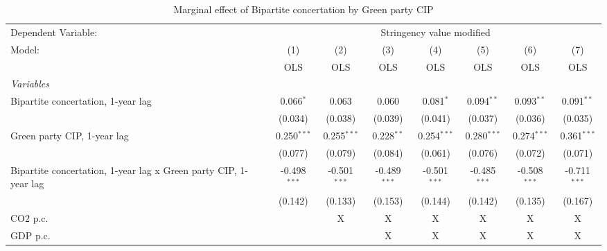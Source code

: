 
\begin{table}[htbp]
   \caption{Marginal effect of Bipartite concertation by Green party CIP}
   \centering
   \begin{tabular}{lccccccc}
      \toprule
      Dependent Variable: & \multicolumn{7}{c}{Stringency value modified}\\
      Model:                                                           & (1)            & (2)            & (3)            & (4)            & (5)            & (6)            & (7)\\  
                                                                       &  OLS           & OLS            & OLS            & OLS            & OLS            & OLS            & OLS\\  
      \midrule
      \emph{Variables}\\
      Bipartite concertation, 1-year lag                               & 0.066$^{*}$    & 0.063          & 0.060          & 0.081$^{*}$    & 0.094$^{**}$   & 0.093$^{**}$   & 0.091$^{**}$\\   
                                                                       & (0.034)        & (0.038)        & (0.039)        & (0.041)        & (0.037)        & (0.036)        & (0.035)\\   
      Green party CIP, 1-year lag                                      & 0.250$^{***}$  & 0.255$^{***}$  & 0.228$^{**}$   & 0.254$^{***}$  & 0.280$^{***}$  & 0.274$^{***}$  & 0.361$^{***}$\\   
                                                                       & (0.077)        & (0.079)        & (0.084)        & (0.061)        & (0.076)        & (0.072)        & (0.071)\\   
      Bipartite concertation, 1-year lag x Green party CIP, 1-year lag & -0.498$^{***}$ & -0.501$^{***}$ & -0.489$^{***}$ & -0.501$^{***}$ & -0.485$^{***}$ & -0.508$^{***}$ & -0.711$^{***}$\\   
                                                                       & (0.142)        & (0.133)        & (0.153)        & (0.144)        & (0.142)        & (0.135)        & (0.167)\\   
      CO2 p.c.                                                         &                & X              & X              & X              & X              & X              & X\\  
      GDP p.c.                                                         &                &                & X              & X              & X              & X              & X\\  

\end{tabular}
\end{table}
